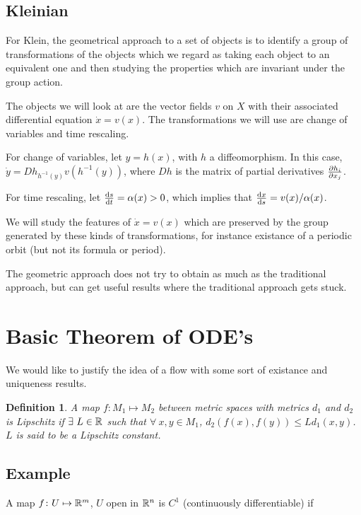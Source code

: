 \documentclass{notes}
\theoremstyle{plain}
\newtheorem*{definition}{Definition}
\begin{document}
\subsection*{Kleinian}

For Klein, the geometrical approach to a set of objects is to identify
a group of transformations of the objects which we regard as taking
each object to an equivalent one and then studying the properties
which are invariant under the group action.

The objects we will look at are the vector fields $v$ on $X$ with
their associated differential equation $\dot{x} = v(x)$.  The
transformations we will use are change of variables and time
rescaling.

For change of variables, let $y = h(x)$, with $h$ a diffeomorphism.
In this case, $\dot{y} = Dh_{h^{-1}(y)} v(h^{-1}(y))$, where $Dh$ is
the matrix of partial derivatives $\frac{\partial h_i}{\partial x_j}$.

For time rescaling, let $\frac{\mathrm{d} s}{\mathrm{d} t} = \alpha(x) > 0$, which implies that
$\frac{\mathrm{d} x}{\mathrm{d} s} = v(x)/\alpha(x)$.

We will study the features of $\dot{x} = v(x)$ which are preserved by
the group generated by these kinds of transformations, for instance
existance of a periodic orbit (but not its formula or period).

The geometric approach does not try to obtain as much as the
traditional approach, but can get useful results where the traditional
approach gets stuck.

\section{Basic Theorem of ODE's}

We would like to justify the idea of a flow with some sort of
existance and uniqueness results.

\begin{definition}
  A map $f \colon M_1 \mapsto M_2$ between metric spaces with metrics $d_1$
  and $d_2$ is \emph{Lipschitz} if $\exists\ L \in \mathbb{R}$ such that
  $\forall\ x, y \in M_1$, $d_2\left(f(x),f(y)\right) \le L
  d_1\left(x,y\right)$.  $L$ is said to be a \emph{Lipschitz
    constant}.
\end{definition}

\subsection*{Example}

A map $f \colon U \mapsto \mathbb{R}^m$, $U$ open in $\mathbb{R}^n$ is $C^1$ (continuously
differentiable) if
\end{document}
